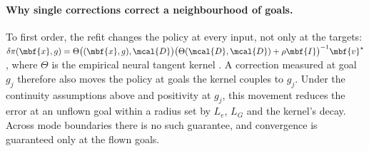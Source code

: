 \paragraph{Why single corrections correct a neighbourhood of goals.}
To first order, the refit changes the policy at every input, not only at the targets:
$\delta\pi(\mbf{x},g)=\Theta\big((\mbf{x},g),\mcal{D}\big)\big(\Theta(\mcal{D},\mcal{D})+\rho\mbf{I}\big)^{-1}\mbf{v}^\star$,
where $\Theta$ is the empirical neural tangent kernel \citep{jacot2018ntk,lee2019wide}. A correction measured at goal
$g_j$ therefore also moves the policy at goals the kernel couples to $g_j$. Under the continuity assumptions above and
positivity at $g_j$, this movement reduces the error at an unflown goal within a radius set by $L_e$, $L_G$ and the
kernel's decay. Across mode boundaries there is no such guarantee, and convergence is guaranteed only at the flown
goals.
